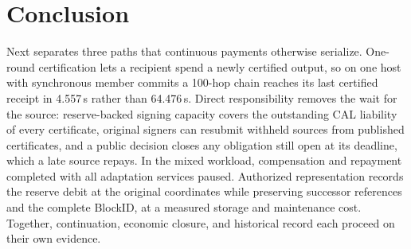 \section{Conclusion}
\label{sec:conclusion}

Next separates three paths that continuous payments otherwise serialize. One-round certification lets a recipient spend a newly certified output, so on one host with synchronous member commits a 100-hop chain reaches its last certified receipt in 4.557\,s rather than 64.476\,s. Direct responsibility removes the wait for the source: reserve-backed signing capacity covers the outstanding CAL liability of every certificate, original signers can resubmit withheld sources from published certificates, and a public decision closes any obligation still open at its deadline, which a late source repays. In the mixed workload, compensation and repayment completed with all adaptation services paused. Authorized representation records the reserve debit at the original coordinates while preserving successor references and the complete BlockID, at a measured storage and maintenance cost. Together, continuation, economic closure, and historical record each proceed on their own evidence.